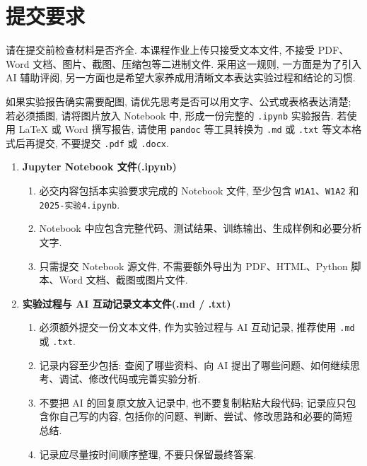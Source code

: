 \documentclass{../../nndlcourse}
\begin{document}
\section{提交要求}

请在提交前检查材料是否齐全. 本课程作业上传只接受文本文件, 不接受 PDF、Word 文档、图片、截图、压缩包等二进制文件. 采用这一规则, 一方面是为了引入 AI 辅助评阅, 另一方面也是希望大家养成用清晰文本表达实验过程和结论的习惯.

如果实验报告确实需要配图, 请优先思考是否可以用文字、公式或表格表达清楚; 若必须插图, 请将图片放入 Notebook 中, 形成一份完整的 \texttt{.ipynb} 实验报告. 若使用 \LaTeX{} 或 Word 撰写报告, 请使用 \texttt{pandoc} 等工具转换为 \texttt{.md} 或 \texttt{.txt} 等文本格式后再提交, 不要提交 \texttt{.pdf} 或 \texttt{.docx}.

\begin{enumerate}
    \item \textbf{Jupyter Notebook 文件(.ipynb)}
    \begin{enumerate}
        \item 必交内容包括本实验要求完成的 Notebook 文件, 至少包含 \texttt{W1A1}、\texttt{W1A2} 和 \texttt{2025-实验4.ipynb}.
        \item Notebook 中应包含完整代码、测试结果、训练输出、生成样例和必要分析文字.
        \item 只需提交 Notebook 源文件, 不需要额外导出为 PDF、HTML、Python 脚本、Word 文档、截图或图片文件.
    \end{enumerate}
    \item \textbf{实验过程与 AI 互动记录文本文件(.md / .txt)}
    \begin{enumerate}
        \item 必须额外提交一份文本文件, 作为实验过程与 AI 互动记录, 推荐使用 \texttt{.md} 或 \texttt{.txt}.
        \item 记录内容至少包括: 查阅了哪些资料、向 AI 提出了哪些问题、如何继续思考、调试、修改代码或完善实验分析.
        \item 不要把 AI 的回复原文放入记录中, 也不要复制粘贴大段代码; 记录应只包含你自己写的内容, 包括你的问题、判断、尝试、修改思路和必要的简短总结.
        \item 记录应尽量按时间顺序整理, 不要只保留最终答案.
    \end{enumerate}
\end{enumerate}


\end{document}
